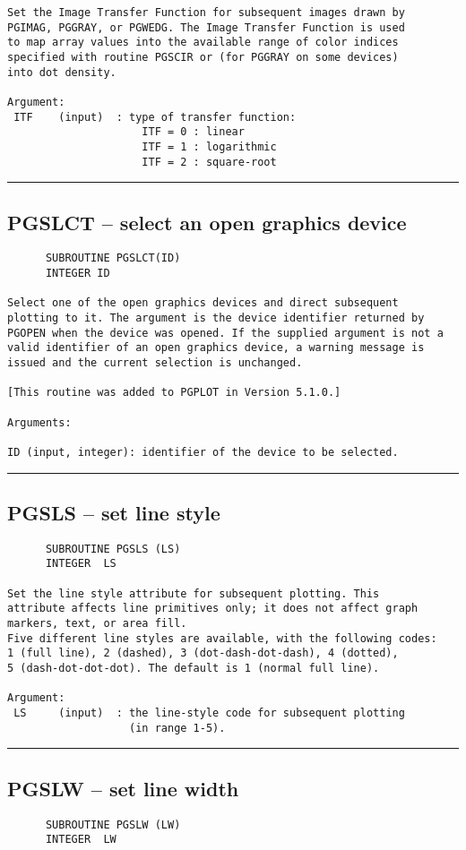 {\begin{verbatim}
Set the Image Transfer Function for subsequent images drawn by
PGIMAG, PGGRAY, or PGWEDG. The Image Transfer Function is used
to map array values into the available range of color indices
specified with routine PGSCIR or (for PGGRAY on some devices)
into dot density.

Argument:
 ITF    (input)  : type of transfer function:
                     ITF = 0 : linear
                     ITF = 1 : logarithmic
                     ITF = 2 : square-root
\end{verbatim}
\hrule


\subsection*{PGSLCT -- select an open graphics device }
\begin{verbatim}
      SUBROUTINE PGSLCT(ID)
      INTEGER ID

Select one of the open graphics devices and direct subsequent
plotting to it. The argument is the device identifier returned by
PGOPEN when the device was opened. If the supplied argument is not a
valid identifier of an open graphics device, a warning message is
issued and the current selection is unchanged.

[This routine was added to PGPLOT in Version 5.1.0.]

Arguments:

ID (input, integer): identifier of the device to be selected.
\end{verbatim}
\hrule


\subsection*{PGSLS -- set line style }
\begin{verbatim}
      SUBROUTINE PGSLS (LS)
      INTEGER  LS

Set the line style attribute for subsequent plotting. This
attribute affects line primitives only; it does not affect graph
markers, text, or area fill.
Five different line styles are available, with the following codes:
1 (full line), 2 (dashed), 3 (dot-dash-dot-dash), 4 (dotted),
5 (dash-dot-dot-dot). The default is 1 (normal full line).

Argument:
 LS     (input)  : the line-style code for subsequent plotting
                   (in range 1-5).
\end{verbatim}
\hrule


\subsection*{PGSLW -- set line width }
\begin{verbatim}
      SUBROUTINE PGSLW (LW)
      INTEGER  LW


\end{verbatim}}
